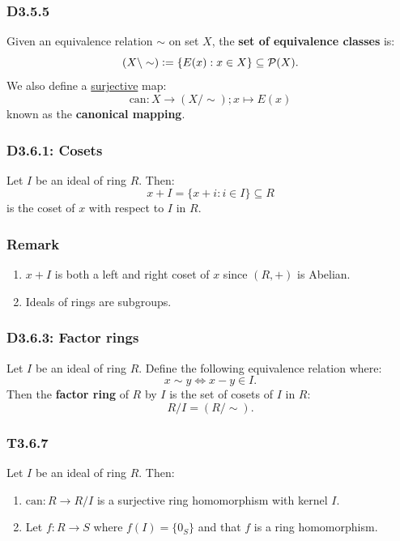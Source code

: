 \documentclass{article}
\newcommand{\deq}{\vcentcolon=}
\begin{document}
\begin{multicols*}{3}
\subsubsection*{D3.5.5}
Given an equivalence relation $\sim$ on set $X$,
the \textbf{set of equivalence classes} is:
$$(X\backslash\sim)\deq\{E(x):x\in X\}
\subseteq\mathcal{P}(X).$$
We also define a \underline{surjective} map:
$$\text{can}:X\rightarrow(X/\sim);x\mapsto E(x)$$
known as the \textbf{canonical mapping}.

\subsubsection*{D3.6.1: Cosets}
Let $I$ be an ideal of ring $R$. Then:
$$x+I=\{x+i:i\in I\}\subseteq R$$
is the coset of $x$ with respect to $I$ in $R$.

\subsubsection*{Remark}
\begin{enumerate}
    \item $x+I$ is both a left and right coset of $x$
    since $(R,+)$ is Abelian.

    \item Ideals of rings are subgroups.
\end{enumerate}

\subsubsection*{D3.6.3: Factor rings}
Let $I$ be an ideal of ring $R$. Define the following
equivalence relation where:
$$x\sim y\iff x-y\in I.$$
Then the \textbf{factor ring} of $R$ by $I$ is the set
of cosets of $I$ in $R$:
$$R/I=(R/\sim).$$

\subsubsection*{T3.6.7}
Let $I$ be an ideal of ring $R$. Then:
\begin{enumerate}
    \item $\text{can}:R\rightarrow R/I$ is a surjective
    ring homomorphism with kernel $I$.

    \item Let $f:R\rightarrow S$ where $f(I)=\{0_S\}$ and
    that $f$ is a ring homomorphism.
    

\end{enumerate}
\end{multicols*}
\end{document}
